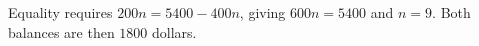 Equality requires $200n=5400-400n$, giving $600n=5400$ and $\boxed{n=9}$. Both balances are then $1800$ dollars.

